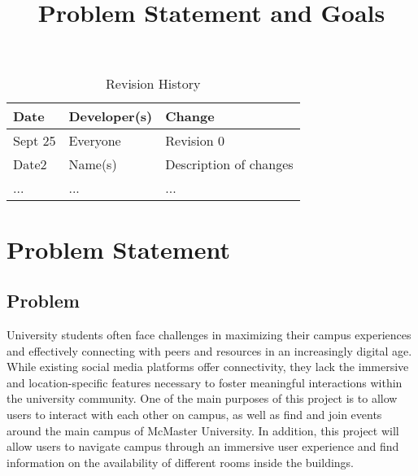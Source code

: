 \documentclass{article}
\title{Problem Statement and Goals\\\progname}
\author{\authname}
\date{}
\begin{document}
\maketitle

\begin{table}[hp]
\caption{Revision History} \label{TblRevisionHistory}
\begin{tabularx}{\textwidth}{llX}
\toprule
\textbf{Date} & \textbf{Developer(s)} & \textbf{Change}\\
\midrule
Sept 25 & Everyone & Revision 0\\
Date2 & Name(s) & Description of changes\\
... & ... & ...\\
\bottomrule
\end{tabularx}
\end{table}

\section{Problem Statement}


\subsection{Problem}

\quad University students often face challenges in maximizing their campus experiences and effectively connecting with peers and resources in an increasingly digital age. While existing social media platforms offer connectivity, they lack the immersive and location-specific features necessary to foster meaningful interactions within the university community. One of the main purposes of this project is to allow users to interact with each other on campus, as well as find and join events around the main campus of McMaster University. In addition, this project will allow users to navigate campus through an immersive user experience and find information on the availability of different rooms inside the buildings.
\end{document}
